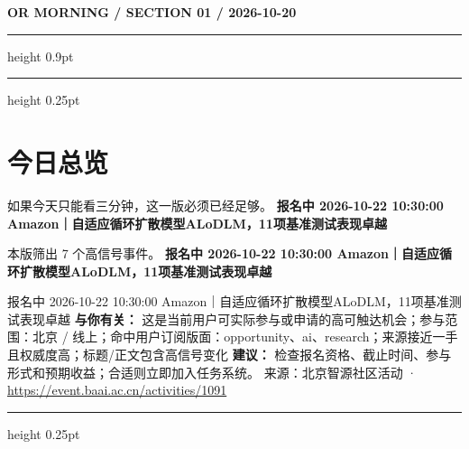 \documentclass[10.5pt]{ctexart}
\begin{document}
{\small\bfseries OR MORNING / SECTION 01 / 2026-10-20}
\vspace{2mm}
\hrule height 0.9pt
\vspace{1.5mm}
\hrule height 0.25pt
\vspace{4mm}
\section*{今日总览}
{\color{ormuted} 如果今天只能看三分钟，这一版必须已经足够。}
\vspace{2mm}
{\fontsize{25}{29}\selectfont\bfseries 报名中 2026-10-22 10:30:00 Amazon｜自适应循环扩散模型ALoDLM，11项基准测试表现卓越}\par
\vspace{2mm}
{\large 本版筛出 7 个高信号事件。}
\vspace{3mm}
{\Large\bfseries 报名中 2026-10-22 10:30:00 Amazon｜自适应循环扩散模型ALoDLM，11项基准测试表现卓越}\par
报名中 2026-10-22 10:30:00 Amazon｜自适应循环扩散模型ALoDLM，11项基准测试表现卓越
\textbf{与你有关：} 这是当前用户可实际参与或申请的高可触达机会；参与范围：北京 / 线上；命中用户订阅版面：opportunity、ai、research；来源接近一手且权威度高；标题/正文包含高信号变化
\textbf{建议：} 检查报名资格、截止时间、参与形式和预期收益；合适则立即加入任务系统。
{\footnotesize\color{ormuted} 来源：北京智源社区活动 · \url{https://event.baai.ac.cn/activities/1091}}
\vspace{3mm}
\hrule height 0.25pt
\vspace{3mm}
\end{document}
